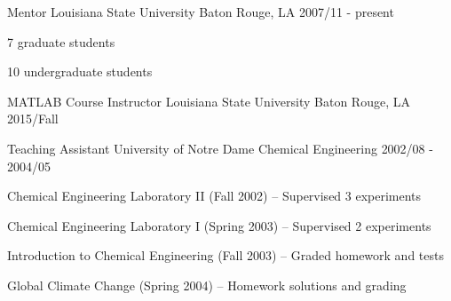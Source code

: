 
\begin{cventries}

  \cventry
    {Mentor} %
    {Louisiana State University} %
    {Baton Rouge, LA} %
    {2007/11 - present} %
    {
      \begin{cvitems} %
        \item {7 graduate students} %
        \item {10 undergraduate students} %
      \end{cvitems}
    }

  \cventry
    {MATLAB Course Instructor} %
    {Louisiana State University} %
    {Baton Rouge, LA} %
    {2015/Fall} %
    {}
  \vspace{-10pt}

  \cventry
    {Teaching Assistant} %
    {University of Notre Dame} %
    {Chemical Engineering} %
    {2002/08 - 2004/05} %
    {
      \begin{cvitems} %
        \item {Chemical Engineering Laboratory II (Fall 2002) – Supervised 3 experiments}
        \item{Chemical Engineering Laboratory I (Spring 2003) – Supervised 2 experiments}
        \item{Introduction to Chemical Engineering (Fall 2003) – Graded homework and tests}
        \item{Global Climate Change (Spring 2004) – Homework solutions and grading}
      \end{cvitems}
    }
    
\end{cventries}